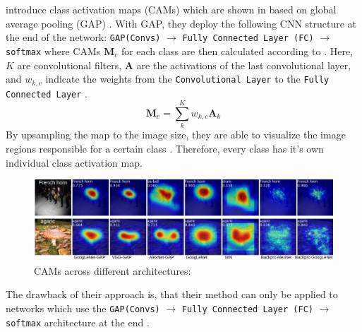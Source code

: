 \citet{ZhouKLOT16} introduce class activation maps (CAMs) which are shown in  based on global average pooling (GAP) \citep{LinCY13}. With GAP, they deploy the following CNN structure at the end of the network: \texttt{GAP(Convs)} $\rightarrow$ \texttt{Fully Connected Layer (FC)} $\rightarrow$ \texttt{softmax} \citep{LinCY13} where CAMs $\mathbf{M}_{c}$ for each class are then calculated according to . Here, $K$ are convolutional filters, $\mathbf{A}$ are the activations of the last convolutional layer, and $ w_{k, c}$ indicate the weights from the \texttt{Convolutional Layer} to the \texttt{Fully Connected Layer} \citep{ZhouKLOT16}.
\begin{equation}
\label{eq:cam}
    \mathbf{M}_{c}=\sum_{k}^{K} w_{k, c} \mathbf{A}_{k}
\end{equation}
By upsampling the map to the image size, they are able to visualize the image regions responsible for a certain class \citep{ZhouKLOT16}. Therefore, every class has it's own individual class activation map. 
\begin{figure}[htbp]
    \centering
    \includegraphics[width=\textwidth]{Figures/Chapter3/heatmapAll.pdf}
    \caption[CAMs across different architectures]{CAMs across different architectures: \citep{ZhouKLOT16}}
    \label{fig:cams}
\end{figure}
The drawback of their approach is, that their method can only be applied to networks which use the \texttt{GAP(Convs)} $\rightarrow$ \texttt{Fully Connected Layer (FC)} $\rightarrow$ \texttt{softmax} architecture at the end \citep{xie2020explainable}. 

